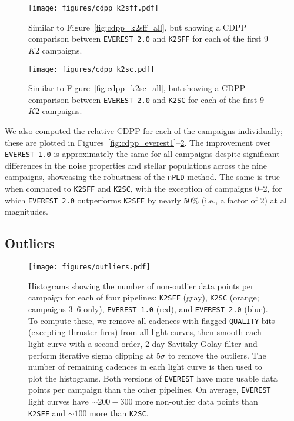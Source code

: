 \documentclass[]{emulateapj}
\begin{document}
\begin{figure}[hbt]
  \begin{center}
      \texttt{[image: figures/cdpp\_k2sff.pdf]}
       \caption{Similar to Figure~\ref{fig:cdpp_k2sff_all}, but showing a CDPP comparison between 
       \texttt{EVEREST 2.0} and \texttt{K2SFF} for each of the first 9 $K2$ campaigns.}
     \label{fig:cdpp_k2sff}
  \end{center}
\end{figure}

\begin{figure}[hbt]
  \begin{center}
      \texttt{[image: figures/cdpp\_k2sc.pdf]}
       \caption{Similar to Figure~\ref{fig:cdpp_k2sc_all}, but showing a CDPP comparison between 
       \texttt{EVEREST 2.0} and \texttt{K2SC} for each of the first 9 $K2$ campaigns.}
     \label{fig:cdpp_k2sc}
  \end{center}
\end{figure}

We also computed the relative CDPP for each of the campaigns individually; these are
plotted in Figures~\ref{fig:cdpp_everest1}--\ref{fig:cdpp_k2sc}. The improvement
over \texttt{EVEREST 1.0} is approximately the same for all campaigns despite significant
differences in the noise properties and stellar populations across the nine campaigns,
showcasing the robustness of the \texttt{nPLD} method.
The same is true when compared to \texttt{K2SFF} and \texttt{K2SC}, with the exception of
campaigns 0--2, for which \texttt{EVEREST 2.0} outperforms \texttt{K2SFF} by nearly 50\%
(i.e., a factor of 2) at all magnitudes.

\subsection{Outliers}

\begin{figure}[hbt]
  \begin{center}
      \texttt{[image: figures/outliers.pdf]}
       \caption{Histograms showing the number of non-outlier data points per campaign for each
        of four pipelines: \texttt{K2SFF} (gray), \texttt{K2SC} (orange; campaigns 3--6 only), 
        \texttt{EVEREST 1.0} (red), and \texttt{EVEREST 2.0} (blue). To compute these, we remove all cadences 
        with flagged \texttt{QUALITY} bits (excepting thruster fires) from all light curves, then
        smooth each light curve with a second order, 2-day Savitsky-Golay filter and perform iterative 
        sigma clipping at 5$\sigma$ to remove the outliers. The number of remaining cadences in
        each light curve is then used to plot the histograms. Both versions of \texttt{EVEREST}
        have more usable data points per campaign than the other pipelines. On average, 
        \texttt{EVEREST} light curves have ${\sim}200-300$ more non-outlier data points than \texttt{K2SFF} 
        and ${\sim}100$ more than \texttt{K2SC}.}
     \label{fig:outliers}
  \end{center}
\end{figure}
\end{document}
